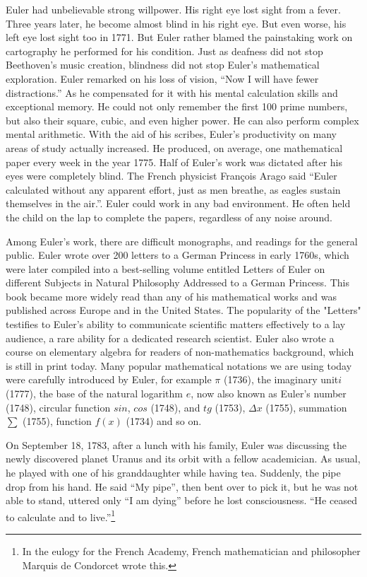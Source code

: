 \documentclass{article}
\begin{document}
Euler had unbelievable strong willpower. His right eye lost sight from a fever. Three years later, he become almost blind in his right eye. But even worse, his left eye lost sight too in 1771. But Euler rather blamed the painstaking work on cartography he performed for his condition. Just as deafness did not stop Beethoven’s music creation, blindness did not stop Euler’s mathematical exploration\cite{HanXueTao2009}. Euler remarked on his loss of vision, ``Now I will have fewer distractions.'' As he compensated for it with his mental calculation skills and exceptional memory. He could not only remember the first 100 prime numbers, but also their square, cubic, and even higher power. He can also perform complex mental arithmetic. With the aid of his scribes, Euler's productivity on many areas of study actually increased. He produced, on average, one mathematical paper every week in the year 1775. Half of Euler's work was dictated after his eyes were completely blind. The French physicist François Arago said ``Euler calculated without any apparent effort, just as men breathe, as eagles sustain themselves in the air.''. Euler could work in any bad environment. He often held the child on the lap to complete the papers, regardless of any noise around.

Among Euler's work, there are difficult monographs, and readings for the general public. Euler wrote over 200 letters to a German Princess in early 1760s, which were later compiled into a best-selling volume entitled Letters of Euler on different Subjects in Natural Philosophy Addressed to a German Princess. This book became more widely read than any of his mathematical works and was published across Europe and in the United States. The popularity of the "Letters" testifies to Euler's ability to communicate scientific matters effectively to a lay audience, a rare ability for a dedicated research scientist. Euler also wrote a course on elementary algebra for readers of non-mathematics background, which is still in print today. Many popular mathematical notations we are using today were carefully introduced by Euler, for example $\pi$ (1736), the imaginary unit$i$ (1777), the base of the natural logarithm $e$, now also known as Euler's number (1748), circular function $sin$, $cos$ (1748), and $tg$ (1753), $\Delta x$ (1755), summation $\sum$ (1755), function $f(x)$ (1734) and so on\cite{HanXueTao2009}.

On September 18, 1783, after a lunch with his family, Euler was discussing the newly discovered planet Uranus and its orbit with a fellow academician. As usual, he played with one of his granddaughter while having tea. Suddenly, the pipe drop from his hand. He said ``My pipe'', then bent over to pick it, but he was not able to stand, uttered only ``I am dying'' before he lost consciousness. ``He ceased to calculate and to live.''\footnote{In the eulogy for the French Academy, French mathematician and philosopher Marquis de Condorcet wrote this.}
\end{document}
